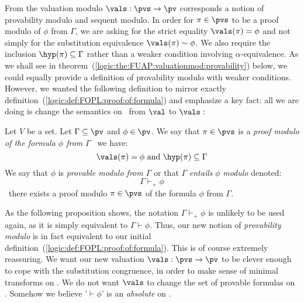 From the valuation modulo $\vals:\pvs\to\pv$ corresponds a notion of
provability modulo and sequent modulo. In order for $\pi\in\pvs$ to
be a proof modulo of $\phi$ from $\Gamma$, we are asking for the
strict equality $\vals(\pi)=\phi$ and not simply for the
substitution equivalence $\vals(\pi)\sim\phi$. We also require the
inclusion $\hyp(\pi)\subseteq\Gamma$ rather than a weaker condition
involving $\alpha$-equivalence. As we shall see in
theorem~(\ref{logic:the:FUAP:valuationmod:provability}) below, we
could equally provide a definition of provability modulo with weaker
conditions. However, we wanted the following definition to mirror
exactly definition~(\ref{logic:def:FOPL:proof:of:formula}) and
emphasize a key fact: all we are doing is change the semantics on
\pvs\ from $\val$ to $\vals$\,:

\begin{defin}\label{logic:def:FUAP:valuationmod:proof:modulo}
Let $V$ be a set. Let $\Gamma\subseteq\pv$ and $\phi\in\pv$. We say
that $\pi\in\pvs$ is a {\em proof modulo of the formula $\phi$ from
$\Gamma$} \ifand\ we have:
    \[
    \vals(\pi)=\phi\mbox{\ and\ }\hyp(\pi)\subseteq\Gamma
    \]
We say that $\phi$ is {\em provable modulo from $\Gamma$} or that
$\Gamma$ {\em entails} $\phi$ {\em modulo} denoted:
    \[
    \Gamma\vdash_{+}\phi
    \]
\ifand\ there exists a proof modulo $\pi\in\pvs$ of the formula
$\phi$ from $\Gamma$.
\end{defin}

As the following proposition shows, the notation
$\Gamma\vdash_{+}\phi$ is unlikely to be used again, as it is simply
equivalent to $\Gamma\vdash\phi$. Thus, our new notion of {\em
provability modulo} is in fact equivalent to our initial
definition~(\ref{logic:def:FOPL:proof:of:formula}). This is of
course extremely reassuring. We want our new valuation
$\vals:\pvs\to\pv$ to be clever enough to cope with the substitution
congruence, in order to make sense of minimal transforms on \pvs. We
do not want $\vals$ to change the set of provable formulas on \pv.
Somehow we believe '$\vdash\phi$' is an {\em absolute} on \pv.

